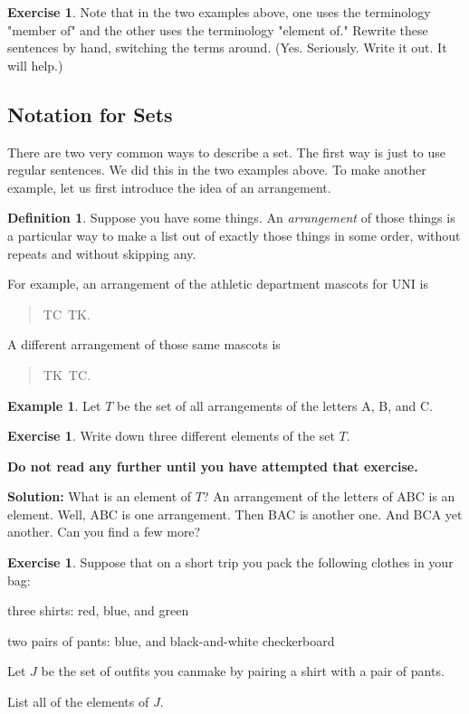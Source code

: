 \documentclass[12pt,letterpaper]{article}
\theoremstyle{definition}
\newtheorem{example}{Example}
\newtheorem{exercise}[question]{Exercise}
\newtheorem*{definition}{Definition}
\begin{document}
\begin{exercise}
Note that in the two examples above, one uses the terminology "member of" and the other uses the terminology "element of." Rewrite these sentences by hand, switching the terms around. 
(Yes. Seriously. Write it out. It will help.)
\end{exercise}

\subsection*{Notation for Sets}

There are two very common ways to describe a set.
The first way is just to use regular sentences.
We did this in the two examples above.
To make another example, let us first introduce the idea of an arrangement.


\begin{definition}
Suppose you have some things. 
An \emph{arrangement} of those things is a particular way to make a list out of exactly those things in some order, without repeats and without skipping any.
\end{definition}

For example, an arrangement of the athletic department mascots for UNI is 
\begin{quote}
TC~TK.
\end{quote}
A different arrangement of those same mascots is
\begin{quote}
TK~TC.
\end{quote}

\begin{example}
Let $T$ be the set of all arrangements of the letters A, B, and C.
\end{example}

\begin{exercise}
Write down three different elements of the set $T$.
\end{exercise}

\textbf{Do not read any further until you have attempted that exercise.}

\clearpage

\noindent\textbf{Solution:} 
What is an element of $T$? An arrangement of the letters of ABC is an element. Well, ABC is one arrangement.
Then BAC is another one. 
And BCA yet another.
Can you find a few more?

\begin{exercise}
Suppose that on a short trip you pack the following clothes in your bag:
\begin{compactitem}
\item three shirts: red, blue, and green
\item two pairs of pants: blue, and black-and-white checkerboard
\end{compactitem}
Let $J$ be the set of outfits you canmake by pairing a shirt with a pair of pants.

List all of the elements of $J$.
\end{exercise}
\end{document}
